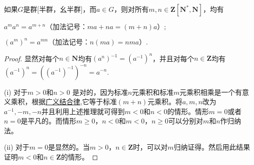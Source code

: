 \documentclass[../../main.tex]{subfiles}
\begin{document}
\begin{theorem}
如果$G$是群[半群，幺半群]，而$a \in G$，则对所有$m, n \in \boldsymbol{Z}[\boldsymbol{N}^*, \boldsymbol{N}]$，均有

 $ a^m a^n = a^{m + n} \text{（加法记号：} ma + na = (m + n)a\text{）}; $

 $ (a^m)^n = a^{mn} \text{（加法记号：} n(ma) = nma\text{）}.$
\end{theorem}
\begin{proof}
显然对每个$n \in \boldsymbol{N}$均有$(a^n)^{-1} = (a^{-1})^n$，并且对每个$n \in \boldsymbol{Z}$均有$(a^{-1})^n=((a^{-1})^{-1})^{-n}=a^{-n}$.

(i) 对于$m > 0$和$n > 0$ 是对的，因为标准$n$元乘积和标准$m$元乘积相乘是一个有意义乘积，根据\hyperref[theorem:广义结合律]{广义结合律},它等于标准$(m + n)$元乘积。将$a, m, n$改为$a^{-1}, -m, -n$并且利用上述推理就可得到$m < 0$和$n < 0$的情形。情形$m = 0$或者$n = 0$是平凡的。而情形$m \geqslant 0$，$n < 0$和$m < 0$，$n \geqslant 0$可以分别对$m$和$n$作归纳法。

(ii) 对于$m = 0$是显然的。当$m > 0$，$n \in \boldsymbol{Z}$时，可以对$m$归纳证得。然后用此结果证明$m < 0$和$n \in \boldsymbol{Z}$的情形。
\end{proof}
\end{document}
